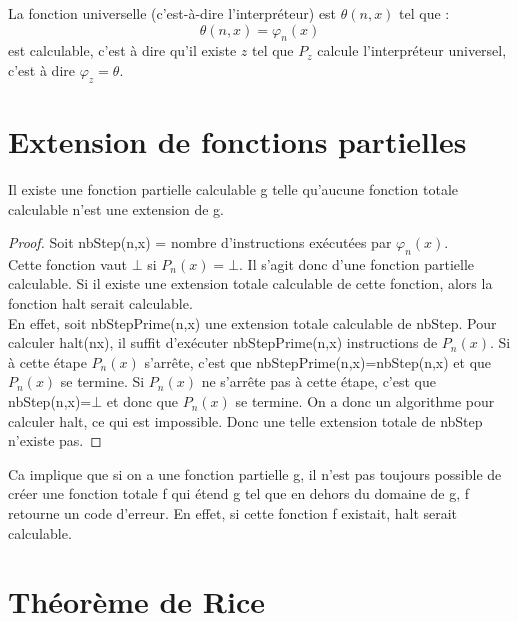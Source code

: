 \begin{mytheo}
  \label{theo:fununiv}
	La fonction universelle (c'est-à-dire l'interpréteur) est $\theta(n,x)$ tel que :
	\[ \theta(n,x) = \varphi_n(x) \]
    est calculable, c'est à dire qu'il existe $z$ tel que $P_z$ calcule l'interpréteur universel,
    c'est à dire $\varphi_z = \theta$.
\end{mytheo}


\section{Extension de fonctions partielles}
\label{sec:extension_de_fonctions_partielles}

\begin{mytheo}
	Il existe une fonction partielle calculable g telle qu'aucune fonction totale calculable n'est une extension de g.
  \begin{proof}
    Soit nbStep(n,x)  = nombre d'instructions exécutées par $\varphi_n(x)$.\\
    Cette fonction vaut $\bot$ si $P_n(x) = \bot$. Il s'agit donc d'une fonction partielle calculable. Si il existe une extension totale calculable de cette fonction, alors la fonction halt serait calculable.\\
    En effet, soit nbStepPrime(n,x) une extension totale calculable de nbStep. Pour calculer halt(nx), il suffit d'exécuter nbStepPrime(n,x) instructions de $P_n(x)$.  Si à cette étape $P_n(x)$ s'arrête, c'est que nbStepPrime(n,x)=nbStep(n,x) et que $P_n(x)$ se termine.  Si $P_n(x)$ ne s'arrête pas à cette étape, c'est que nbStep(n,x)=$\bot$ et donc que $P_n(x)$ se termine. On a donc un algorithme pour calculer halt, ce qui est impossible.  Donc une telle extension totale de nbStep n'existe pas.
  \end{proof}
\end{mytheo}

\begin{myrem}
	Ca implique que si on a une fonction partielle g, il n'est pas
	toujours possible de créer une fonction totale f qui étend g
	tel que en dehors du domaine de g, f retourne un code d'erreur.  En effet, si cette fonction f existait, halt serait calculable.
\end{myrem}


\section{Théorème de Rice}
\label{sub:theoreme_de_rice}

